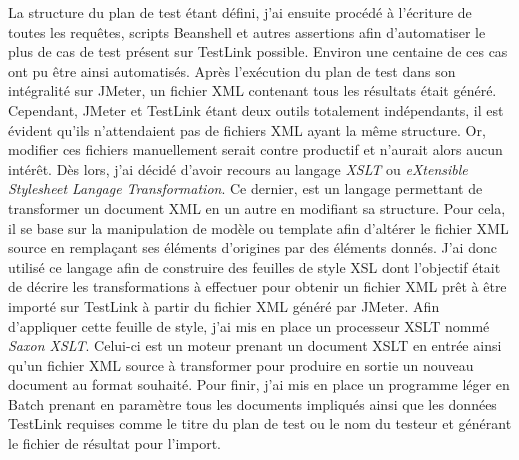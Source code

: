 	La structure du plan de test étant défini, j'ai ensuite procédé à l'écriture de toutes les requêtes, scripts Beanshell et autres assertions afin d'automatiser le plus de cas de test présent sur TestLink possible. Environ une centaine de ces cas ont pu être ainsi automatisés. Après l'exécution du plan de test dans son intégralité sur JMeter, un fichier XML contenant tous les résultats était généré. \\
	
	 Cependant, JMeter et TestLink étant deux outils totalement indépendants, il est évident qu'ils n'attendaient pas de fichiers XML ayant la même structure. Or, modifier ces fichiers manuellement serait contre productif et n'aurait alors aucun intérêt. Dès lors, j'ai décidé d'avoir recours au langage \textit{XSLT} ou \textit{eXtensible Stylesheet Langage Transformation}. Ce dernier, est un langage permettant de transformer un document XML en un autre en modifiant sa structure. Pour cela, il se base sur la manipulation de modèle ou template afin d'altérer le fichier XML source en remplaçant ses éléments d'origines par des éléments donnés. J'ai donc utilisé ce langage afin de construire des feuilles de style XSL dont l'objectif était de décrire les transformations à effectuer pour obtenir un fichier XML prêt à être importé sur TestLink à partir du fichier XML généré par JMeter. Afin d'appliquer cette feuille de style, j'ai mis en place un processeur XSLT nommé \textit{Saxon XSLT}. Celui-ci est un moteur prenant un document XSLT en entrée ainsi qu'un fichier XML source à transformer pour produire en sortie un nouveau document au format souhaité. Pour finir, j'ai mis en place un programme léger en Batch prenant en paramètre tous les documents impliqués ainsi que les données TestLink requises comme le titre du plan de test ou le nom du testeur et générant le fichier de résultat pour l'import.